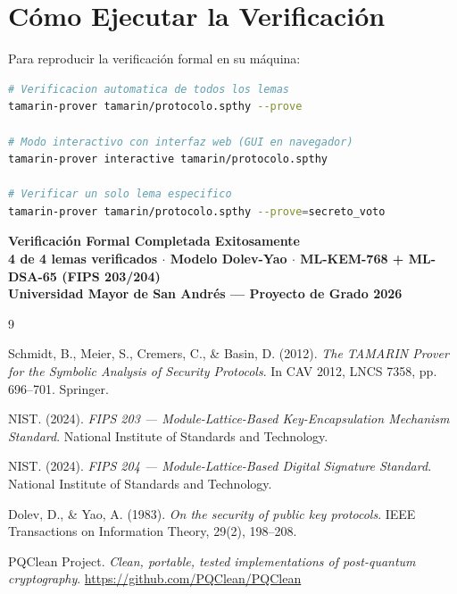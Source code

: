 \documentclass[12pt, a4paper]{article}
\begin{document}
\section{Cómo Ejecutar la Verificación}

Para reproducir la verificación formal en su máquina:

\begin{lstlisting}[language=bash, backgroundcolor=\color{codigoFondo},
                   basicstyle=\ttfamily\small\color{codigoTexto}, numbers=none,
                   caption={Comandos para ejecutar la verificación.}]
# Verificacion automatica de todos los lemas
tamarin-prover tamarin/protocolo.spthy --prove

# Modo interactivo con interfaz web (GUI en navegador)
tamarin-prover interactive tamarin/protocolo.spthy

# Verificar un solo lema especifico
tamarin-prover tamarin/protocolo.spthy --prove=secreto_voto
\end{lstlisting}

\bigskip

\begin{tcolorbox}[colback=green!8, colframe=verdePASS, boxrule=0.9pt, arc=5pt]
\centering\bfseries\color{verdePASS}
Verificación Formal Completada Exitosamente\\[0.3em]
\normalfont\small
4 de 4 lemas verificados $\cdot$ Modelo Dolev-Yao $\cdot$ ML-KEM-768 + ML-DSA-65 (FIPS 203/204)\\
Universidad Mayor de San Andrés — Proyecto de Grado 2026
\end{tcolorbox}

\newpage
\begin{thebibliography}{9}

  Schmidt, B., Meier, S., Cremers, C., \& Basin, D. (2012).
  \textit{The TAMARIN Prover for the Symbolic Analysis of Security Protocols}.
  In CAV 2012, LNCS 7358, pp. 696–701. Springer.

  NIST. (2024).
  \textit{FIPS 203 — Module-Lattice-Based Key-Encapsulation Mechanism Standard}.
  National Institute of Standards and Technology.

  NIST. (2024).
  \textit{FIPS 204 — Module-Lattice-Based Digital Signature Standard}.
  National Institute of Standards and Technology.

  Dolev, D., \& Yao, A. (1983).
  \textit{On the security of public key protocols}.
  IEEE Transactions on Information Theory, 29(2), 198–208.

  PQClean Project.
  \textit{Clean, portable, tested implementations of post-quantum cryptography}.
  \url{https://github.com/PQClean/PQClean}

\end{thebibliography}
\end{document}
